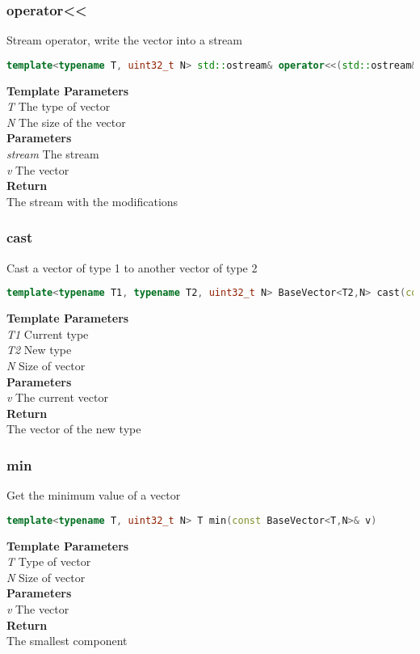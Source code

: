 \subsubsection{operator<<}
\begin{mdframed}
Stream operator, write the vector into a stream
\begin{lstlisting}[language=C++]
template<typename T, uint32_t N> std::ostream& operator<<(std::ostream& stream, const BaseVector<T,N>& v) 
\end{lstlisting}
\textbf{Template Parameters} \\ 
\textit{T} The type of vector \\ 
\textit{N} The size of the vector \\ 
\textbf{Parameters} \\ 
\textit{stream} The stream \\ 
\textit{v} The vector \\ 
\textbf{Return} \\ 
The stream with the modifications\\ 
\end{mdframed}

\subsubsection{cast}
\begin{mdframed}
Cast a vector of type 1 to another vector of type 2
\begin{lstlisting}[language=C++]
template<typename T1, typename T2, uint32_t N> BaseVector<T2,N> cast(const BaseVector<T1,N>& v) 
\end{lstlisting}
\textbf{Template Parameters} \\ 
\textit{T1} Current type \\ 
\textit{T2} New type \\ 
\textit{N} Size of vector \\ 
\textbf{Parameters} \\ 
\textit{v} The current vector \\ 
\textbf{Return} \\ 
The vector of the new type\\ 
\end{mdframed}

\subsubsection{min}
\begin{mdframed}
Get the minimum value of a vector
\begin{lstlisting}[language=C++]
template<typename T, uint32_t N> T min(const BaseVector<T,N>& v) 
\end{lstlisting}
\textbf{Template Parameters} \\ 
\textit{T} Type of vector \\ 
\textit{N} Size of vector \\ 
\textbf{Parameters} \\ 
\textit{v} The vector \\ 
\textbf{Return} \\ 
The smallest component\\ 
\end{mdframed}

